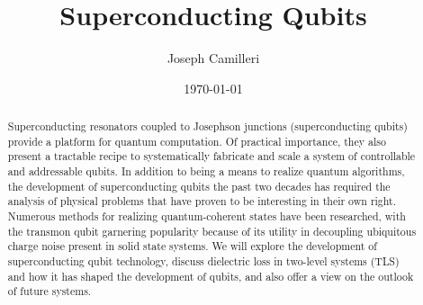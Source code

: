 \documentclass[%
 reprint,
showpacs,
 amsmath,amssymb,
 aps,
longbibliography,
]{revtex4-1}
\begin{document}

\title{Superconducting Qubits}%

\author{Joseph Camilleri}
%

%

\date{\today}%

\begin{abstract}

Superconducting resonators coupled to Josephson junctions (superconducting qubits) provide a platform for quantum computation. Of practical importance, they also present a tractable recipe to systematically fabricate and scale a system of controllable and addressable qubits. In addition to being a means to realize quantum algorithms, the development of superconducting qubits the past two decades has required the analysis of physical problems that have proven to be interesting in their own right. Numerous methods for realizing quantum-coherent states have been researched, with the transmon qubit garnering popularity because of its utility in decoupling ubiquitous charge noise present in solid state systems. We will explore the development of superconducting qubit technology, discuss dielectric loss in two-level systems (TLS) and how it has shaped the development of qubits, and also offer a view on the outlook of future systems.

\end{abstract}


\maketitle

\end{document}
